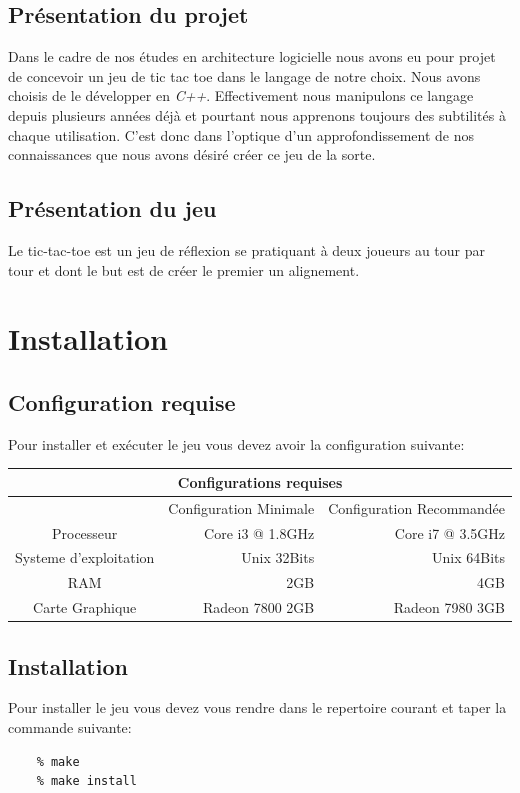 \documentclass[a4paper,12pt]{article}
\begin{document}
\subsection{Présentation du projet}
Dans le cadre de nos études en architecture logicielle nous avons eu pour projet de concevoir un jeu de tic tac toe dans le langage de notre choix. Nous avons choisis de le développer en \textit{C++}. Effectivement nous manipulons ce langage depuis plusieurs années déjà et pourtant nous apprenons toujours des subtilités à chaque utilisation. C'est donc dans l'optique d'un approfondissement de nos connaissances que nous avons désiré créer ce jeu de la sorte.
\subsection{Présentation du jeu}
Le tic-tac-toe est un jeu de réflexion se pratiquant à deux joueurs au tour par tour et dont le but est de créer le premier un alignement.
 

\section{Installation}
\subsection{Configuration requise}
Pour installer et exécuter le jeu vous devez avoir la configuration suivante: 
\begin{tabular}{|c|r|r|}
	\hline
	\multicolumn{3}{|c|}{\textbf {Configurations requises}} \\
	\hline
	& Configuration Minimale & Configuration Recommandée \\
	\hline
	Processeur & Core i3 @ 1.8GHz & Core i7 @ 3.5GHz  \\
	\hline
	Systeme d'exploitation & Unix 32Bits & Unix 64Bits \\
	\hline
	RAM & 2GB & 4GB \\
	\hline
	Carte Graphique & Radeon 7800 2GB & Radeon 7980 3GB \\
	\hline
\end{tabular}

\subsection{Installation}
Pour installer le jeu vous devez vous rendre dans le repertoire courant et taper la commande suivante:
\begin{verbatim}
	% make
	% make install 
\end{verbatim}
\end{document}
